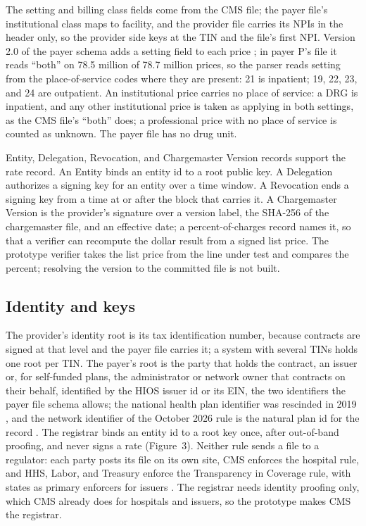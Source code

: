 \documentclass[10pt]{article}
\begin{document}
The setting and billing class fields come from the CMS file; the payer file's institutional class maps to facility, and the provider file carries its NPIs in the header only, so the provider side keys at the TIN and the file's first NPI. Version 2.0 of the payer schema adds a setting field to each price \cite{ticschema}; in payer P's file it reads ``both'' on 78.5 million of 78.7 million prices, so the parser reads setting from the place-of-service codes where they are present: 21 is inpatient; 19, 22, 23, and 24 are outpatient. An institutional price carries no place of service: a DRG is inpatient, and any other institutional price is taken as applying in both settings, as the CMS file's ``both'' does; a professional price with no place of service is counted as unknown. The payer file has no drug unit.

Entity, Delegation, Revocation, and Chargemaster Version records support the rate record. An Entity binds an entity id to a root public key. A Delegation authorizes a signing key for an entity over a time window. A Revocation ends a signing key from a time at or after the block that carries it. A Chargemaster Version is the provider's signature over a version label, the SHA-256 of the chargemaster file, and an effective date; a percent-of-charges record names it, so that a verifier can recompute the dollar result from a signed list price. The prototype verifier takes the list price from the line under test and compares the percent; resolving the version to the committed file is not built.

\subsection*{Identity and keys}

The provider's identity root is its tax identification number, because contracts are signed at that level and the payer file carries it; a system with several TINs holds one root per TIN. The payer's root is the party that holds the contract, an issuer or, for self-funded plans, the administrator or network owner that contracts on their behalf, identified by the HIOS issuer id or its EIN, the two identifiers the payer file schema allows; the national health plan identifier was rescinded in 2019 \cite{hpid}, and the network identifier of the October 2026 rule is the natural plan id for the record \cite{tic2026}. The registrar binds an entity id to a root key once, after out-of-band proofing, and never signs a rate (Figure~3). Neither rule sends a file to a regulator: each party posts its file on its own site, CMS enforces the hospital rule, and HHS, Labor, and Treasury enforce the Transparency in Coverage rule, with states as primary enforcers for issuers \cite{tic}. The registrar needs identity proofing only, which CMS already does for hospitals and issuers, so the prototype makes CMS the registrar.
\end{document}
